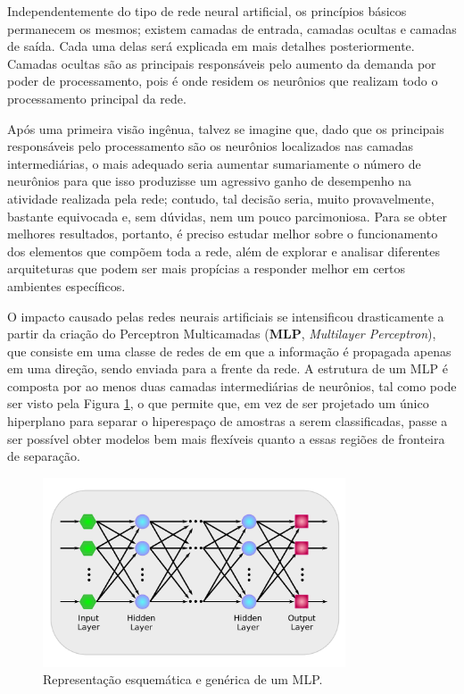 Independentemente do tipo de rede neural artificial, os princípios básicos permanecem os mesmos; existem camadas de entrada, camadas ocultas e camadas de saída. Cada uma delas será explicada em mais detalhes posteriormente. Camadas ocultas são as principais responsáveis pelo aumento da demanda por poder de processamento, pois é onde residem os neurônios que realizam todo o processamento principal da rede.

Após uma primeira visão ingênua, talvez se imagine que, dado que os principais responsáveis pelo processamento são os neurônios localizados nas camadas intermediárias, o mais adequado seria aumentar sumariamente o número de neurônios para que isso produzisse um agressivo ganho de desempenho na atividade realizada pela rede; contudo, tal decisão seria, muito provavelmente, bastante equivocada e, sem dúvidas, nem um pouco parcimoniosa. Para se obter melhores resultados, portanto, é preciso estudar melhor sobre o funcionamento dos elementos que compõem toda a rede, além de explorar e analisar diferentes arquiteturas que podem ser mais propícias a responder melhor em certos ambientes específicos.

O impacto causado pelas redes neurais artificiais se intensificou drasticamente a partir da criação do Perceptron Multicamadas (\textbf{MLP}, \textit{Multilayer Perceptron}), que consiste em uma classe de redes de em que a informação é propagada apenas em uma direção, sendo enviada para a frente da rede. A estrutura de um MLP é composta por ao menos duas camadas intermediárias de neurônios, tal como pode ser visto pela Figura \ref{fig:ann_mlp}, o que permite que, em vez de ser projetado um único hiperplano para separar o hiperespaço de amostras a serem classificadas, passe a ser possível obter modelos bem mais flexíveis quanto a essas regiões de fronteira de separação.


\begin{figure}[H]
    \centering
    \includegraphics[width=0.8\textwidth]{figs/ann_mlp.pdf}
    \caption{Representação esquemática e genérica de um MLP.}
    \label{fig:ann_mlp}
\end{figure}

